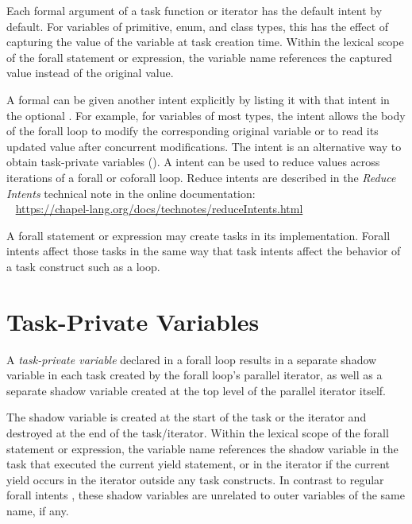 Each formal argument of a task function or iterator has the default
intent by default.  For variables of primitive, enum, and class
types, this has the effect of capturing the value of the
variable at task creation time.  Within the lexical scope of the
forall statement or expression, the variable name references the
captured value instead of the original value.

A formal can be given another intent explicitly by listing it
with that intent in the optional .
For example, for variables of most types, the  intent allows
the body of the forall loop to modify the corresponding original
variable or to read its updated value after concurrent modifications.
The  intent is an alternative way to obtain task-private
variables ().
A  intent can be used to reduce values across iterations
of a forall or coforall loop.
Reduce intents are described in the \emph{Reduce Intents} technical note
in the online documentation:
\\ %
\mbox{$$ $$ $$} %
\url{https://chapel-lang.org/docs/technotes/reduceIntents.html}

\begin{rationale}
A forall statement or expression may create tasks in its implementation.
Forall intents affect those tasks in the same way that task intents
affect the behavior of a task construct such as a  loop.
\end{rationale}


\section{Task-Private Variables}
\label{Task_Private_Variables}

A \emph{task-private variable} declared in a forall loop results
in a separate shadow variable in each task created by the forall
loop's parallel iterator, as well as a separate shadow variable
created at the top level of the parallel iterator itself.

The shadow variable is created at the start of the task or the
iterator and destroyed at the end of the task/iterator.
Within the lexical scope of the forall statement or expression,
the variable name references the shadow variable in the task
that executed the current yield statement, or in the iterator
if the current yield occurs in the iterator outside any task constructs.
In contrast to regular forall intents ,
these shadow variables are unrelated to outer variables of the same name,
if any.

